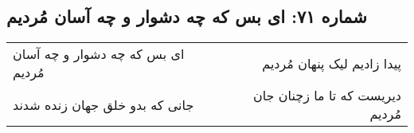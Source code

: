 \begin{center}
\section*{شماره ۷۱: ای بس که چه دشوار و چه آسان مُردیم}
\label{sec:071}
\begin{longtable}{l p{0.5cm} r}
ای بس که چه دشوار و چه آسان مُردیم
&&
پیدا زادیم لیک پنهان مُردیم
\\
جانی که بدو خلق جهان زنده شدند
&&
دیریست که تا ما زچنان جان مُردیم
\\
\end{longtable}
\end{center}
